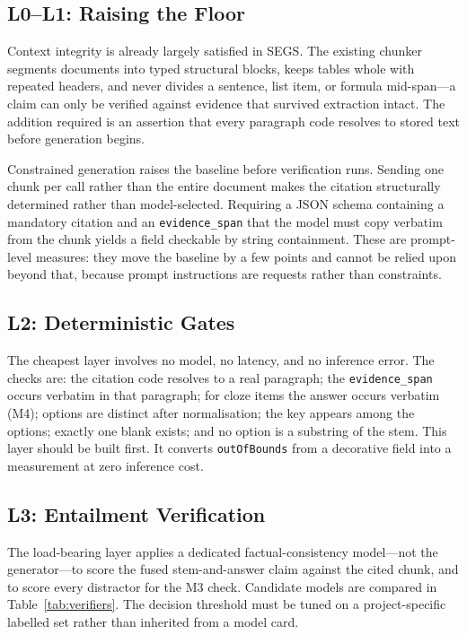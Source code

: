 \documentclass[stu,11pt,floatsintext]{apa7}
\begin{document}
\subsection{L0--L1: Raising the Floor}

Context integrity is already largely satisfied in SEGS. The existing chunker
segments documents into typed structural blocks, keeps tables whole with
repeated headers, and never divides a sentence, list item, or formula
mid-span---a claim can only be verified against evidence that survived
extraction intact. The addition required is an assertion that every paragraph
code resolves to stored text before generation begins.

Constrained generation raises the baseline before verification runs. Sending one
chunk per call rather than the entire document makes the citation structurally
determined rather than model-selected. Requiring a JSON schema containing a
mandatory citation and an \texttt{evidence\_span} that the model must copy
verbatim from the chunk yields a field checkable by string containment. These
are prompt-level measures: they move the baseline by a few points and cannot be
relied upon beyond that, because prompt instructions are requests rather than
constraints.

\subsection{L2: Deterministic Gates}

The cheapest layer involves no model, no latency, and no inference error. The
checks are: the citation code resolves to a real paragraph; the
\texttt{evidence\_span} occurs verbatim in that paragraph; for cloze items the
answer occurs verbatim (M4); options are distinct after normalisation; the key
appears among the options; exactly one blank exists; and no option is a
substring of the stem. This layer should be built first. It converts
\texttt{outOfBounds} from a decorative field into a measurement at zero
inference cost.

\subsection{L3: Entailment Verification}

The load-bearing layer applies a dedicated factual-consistency model---not the
generator---to score the fused stem-and-answer claim against the cited chunk,
and to score every distractor for the M3 check. Candidate models are compared in
Table~\ref{tab:verifiers}. The decision threshold must be tuned on a
project-specific labelled set rather than inherited from a model card.
\end{document}
